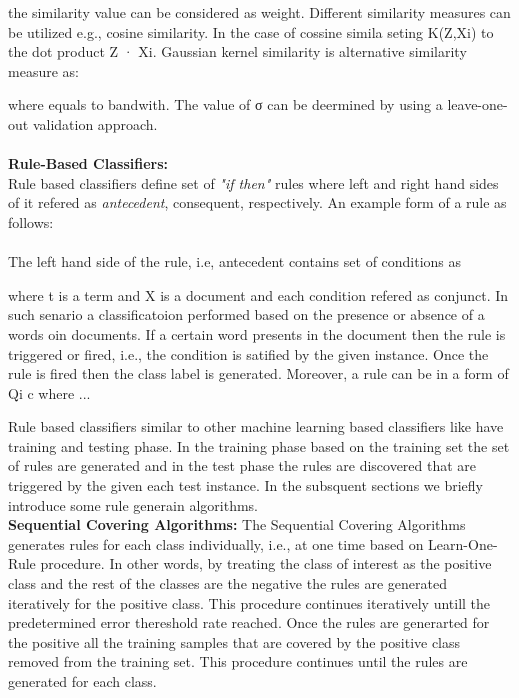 the similarity value can be considered as weight. Different similarity measures can be utilized e.g., cosine similarity. In the case of cossine simila  seting  K(Z,Xi) to the dot product Z · Xi. Gaussian kernel similarity is alternative similarity measure as:

where equals to bandwith. The value of σ can be deermined by using a leave-one-out validation approach.
\\

\\
\textbf{Rule-Based Classifiers:}\\
Rule based classifiers define set of \textit{"if then"} rules where left and right hand sides of it refered as \textit{antecedent}, consequent, respectively. An example form of a rule as follows:\\
\\

The left hand side of the rule, i.e, antecedent contains set of conditions as  

where t is a term and X is a document and each condition refered as conjunct. In such senario a classificatoion performed based on the presence or absence of a words oin documents. If a certain word presents in the document then the rule is triggered or fired, i.e., the condition is satified by the given instance. Once the rule is fired then the class label is generated. Moreover, a rule can be in a form of Qi c where ...

Rule based classifiers similar to other machine learning based classifiers like have training and testing phase. In the training phase based on the training set the set of rules are generated and in the test phase the rules are discovered that are triggered by the given each test instance. In the subsquent sections we briefly introduce some rule generain algorithms.\\

\textbf{Sequential Covering Algorithms:}
The Sequential Covering Algorithms generates rules for each class individually, i.e., at one time based on  Learn-One-Rule procedure. In other words, by treating the class of interest as the positive class and the rest of the classes are the negative the rules are generated iteratively for the positive class. This procedure continues iteratively untill the predetermined error thereshold rate reached. Once the rules are generarted for the positive all the training samples that are covered by the positive class removed from the training set. This procedure continues until the rules are generated for each class.

